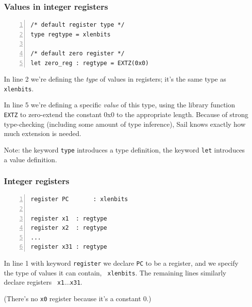 \documentclass[aspectratio=169]{beamer}
\newcommand{\slidefont}{\scriptsize}
\newcommand{\cf}{\scriptsize\tt}
\begin{document}
\begin{frame}[fragile]
  \frametitle{Values in integer registers}

  \slidefont

  \begin{Verbatim}[frame=single, numbers=left, label = File riscv\_reg\_type.sail]
/* default register type */
type regtype = xlenbits

/* default zero register */
let zero_reg : regtype = EXTZ(0x0)
  \end{Verbatim}

  \begin{minipage}{\textwidth}
    In line 2 we're defining the \emph{type} of values in registers;
    it's the same type as {\cf xlenbits}.

    \vspace{1ex}

    In line 5 we're defining a specific \emph{value} of this type,
    using the library function {\cf EXTZ} to zero-extend the constant
    0x0 to the appropriate length.  Because of strong type-checking
    (including some amount of type inference), Sail knows exactly how
    much extension is needed.

    \vspace{1ex}

    Note: the keyword {\cf type} introduces a type definition, the
    keyword {\cf let} introduces a value definition.
  \end{minipage}

\end{frame}


\begin{frame}[fragile]
  \frametitle{Integer registers}

  \slidefont

  \begin{Verbatim}[frame=single, numbers=left, label = File riscv\_regs.sail]
register PC       : xlenbits

register x1  : regtype
register x2  : regtype
...
register x31 : regtype
  \end{Verbatim}

  \begin{minipage}{\textwidth}
    In line 1 with keyword {\cf register} we declare {\cf PC} to be a
    register, and we specify the type of values it can contain, {\cf
      xlenbits}.  The remaining lines similarly declare registers {\cf
      x1}...{\cf x31}.

    \vspace{1ex}

    (There's no {\cf x0} register because it's a constant 0.)

  \end{minipage}

\end{frame}
\end{document}
